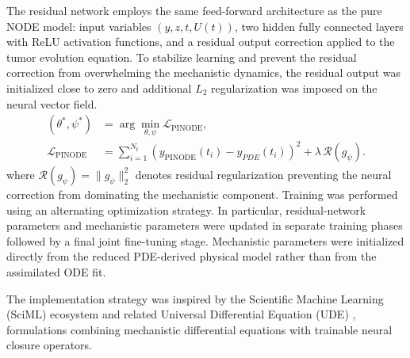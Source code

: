 The residual network employs the same feed-forward architecture as the
pure NODE model:
input variables $(y,z,t,U(t))$,
two hidden fully connected layers with ReLU activation functions,
and a residual output correction applied to the tumor evolution
equation.
To stabilize learning and prevent the residual correction from
overwhelming the mechanistic dynamics, the residual output was
initialized close to zero and additional \(L_2\) regularization was
imposed on the neural vector field.
\begin{equation}
\label{eq:pinode_training}
\begin{aligned}
(\theta^{*},\psi^{*})
&=
\arg\min_{\theta,\psi}
\mathcal{L}_{\mathrm{PINODE}},
\\
\mathcal{L}_{\mathrm{PINODE}}
&=
\sum_{i=1}^{N_t}
\left(
y_{\mathrm{PINODE}}(t_i)
-
y_{PDE}(t_i)
\right)^2
+
\lambda\,\mathcal{R}(g_{\psi}).
\end{aligned}
\end{equation}
where $\mathcal{R}(g_{\psi})
=\|g_{\psi}\|_2^2$
denotes residual regularization preventing the neural correction from
dominating the mechanistic component.
Training was performed using an alternating optimization strategy. In
particular, residual-network parameters and mechanistic parameters were
updated in separate training phases followed by a final joint
fine-tuning stage. Mechanistic parameters were initialized directly from
the reduced PDE-derived physical model rather than from the assimilated
ODE fit.

The implementation strategy was inspired by the Scientific Machine
Learning (SciML) ecosystem and related Universal Differential Equation
(UDE) \cite{rackauckas2019diffeqflux}, \cite{rackauckas2020ude} formulations combining mechanistic differential equations with
trainable neural closure operators.
